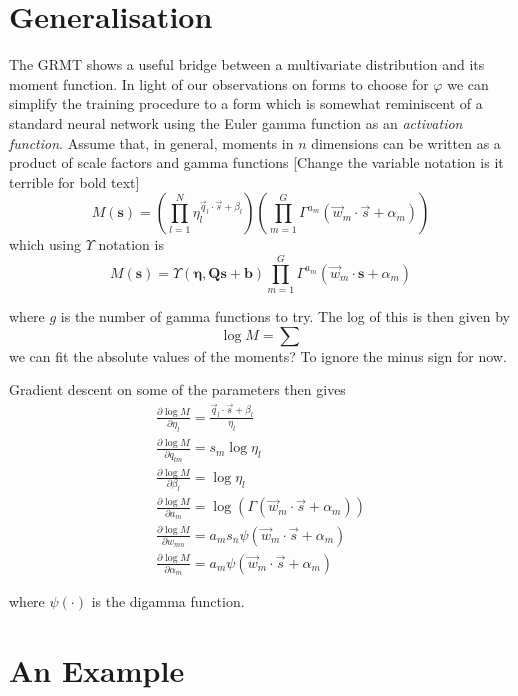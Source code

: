 \documentclass[journal=jcisd8,manuscript=article,layout=onecolumn,pdftex,floatfix,amsmath,amssymb,10pt]{achemso}
\begin{document}
\section{Generalisation}
The GRMT shows a useful bridge between a multivariate distribution and its moment function. In light of our observations on forms to choose for $\varphi$ we can simplify the training procedure to a form which is somewhat reminiscent of a standard neural network using the Euler gamma function as an \emph{activation function}. Assume that, in general, moments in $n$ dimensions can be written as a product of scale factors and gamma functions {\color{red} [Change the variable notation is it terrible for bold text]}
\begin{equation}
M(\mathbf{s}) =\left(\prod_{l=1}^N \eta_l^{ \vec{q}_l \cdot \vec{s} + \beta_l} \right)\left( \prod_{m=1}^G \Gamma^{a_m}(\vec{w}_m \cdot \vec{s} + \alpha_m) \right)
\end{equation}
which using $\Upsilon$ notation is
\begin{equation}
M(\mathbf{s}) =\Upsilon(\mathbf{\eta},\mathbf{Q}\mathbf{s} + \mathbf{b})\prod_{m=1}^G \Gamma^{a_m}(\vec{w}_m \cdot \mathbf{s} + \alpha_m) 
\end{equation}

where $g$ is the number of gamma functions to try. The log of this is then given by 
$$
\log M = \sum
$$
we can fit the absolute values of the moments? To ignore the minus sign for now.

Gradient descent on some of the parameters then gives
\begin{align}
\frac{\partial \log M }{\partial \eta_l} = \frac{\vec{q}_l \cdot \vec{s} + \beta_l}{\eta_l}\\
\frac{\partial \log M }{\partial q_{lm}} = s_m \log \eta_l\\
\frac{\partial \log M }{\partial \beta_l} = \log \eta_l\\
\frac{\partial \log M }{\partial a_m} = \log(\Gamma(\vec{w}_m \cdot \vec{s} + \alpha_m))\\
\frac{\partial \log M }{\partial w_{mn}} = a_m s_n \psi(\vec{w}_m \cdot \vec{s} + \alpha_m)\\
\frac{\partial \log M }{\partial \alpha_m} = a_m \psi(\vec{w}_m \cdot \vec{s} + \alpha_m)
\end{align}

where $\psi(\cdot)$ is the digamma function.


\section{An Example}
\end{document}
